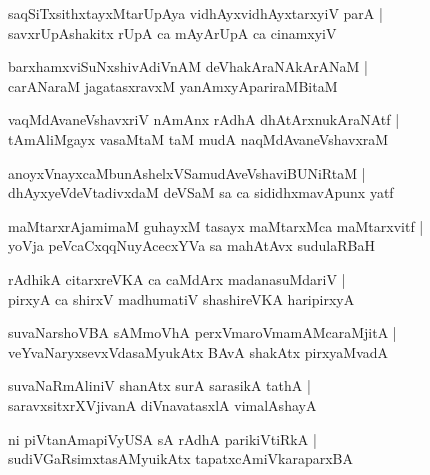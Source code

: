 \documentclass[twoside,12pt,openright]{book}
\newcounter{shloka}[chapter]
\begin{document}
\begin{shloka}%
saqSiTxsithxtayxMtarUpAya vidhAyxvidhAyxtarxyiV parA |\\
savxrUpAshakitx rUpA ca mAyArUpA ca cinamxyiV 
\end{shloka}

\begin{shloka}%
barxhamxviSuNxshivAdiVnAM deVhakAraNAkArANaM |\\
carANaraM jagatasxravxM yanAmxyApariraMBitaM 
\end{shloka}

\begin{shloka}%
vaqMdAvaneVshavxriV nAmAnx rAdhA dhAtArxnukAraNAtf |\\
tAmAliMgayx vasaMtaM taM mudA naqMdAvaneVshavxraM 
\end{shloka}

\begin{shloka}%
anoyxVnayxcaMbunAshelxVSamudAveVshaviBUNiRtaM |\\
dhAyxyeVdeVtadivxdaM deVSaM sa ca sididhxmavApunx yatf 
\end{shloka}

\begin{shloka}%
maMtarxrAjamimaM guhayxM tasayx maMtarxMca maMtarxvitf |\\
yoVja peVcaCxqqNuyAcecxYVa sa mahAtAvx sudulaRBaH
\end{shloka}

\begin{shloka}%
rAdhikA citarxreVKA ca caMdArx madanasuMdariV |\\
pirxyA ca shirxV madhumatiV shashireVKA haripirxyA 
\end{shloka}

\begin{shloka}%
suvaNarshoVBA sAMmoVhA  perxVmaroVmamAMcaraMjitA |\\
veYvaNaryxsevxVdasaMyukAtx BAvA shakAtx pirxyaMvadA
\end{shloka}

\begin{shloka}%
suvaNaRmAliniV shanAtx surA sarasikA tathA |\\
saravxsitxrXVjivanA diVnavatasxlA vimalAshayA
\end{shloka}

\begin{shloka}%
ni piVtanAmapiVyUSA sA rAdhA parikiVtiRkA |\\
sudiVGaRsimxtasAMyuikAtx tapatxcAmiVkaraparxBA
\end{shloka}
\end{document}
